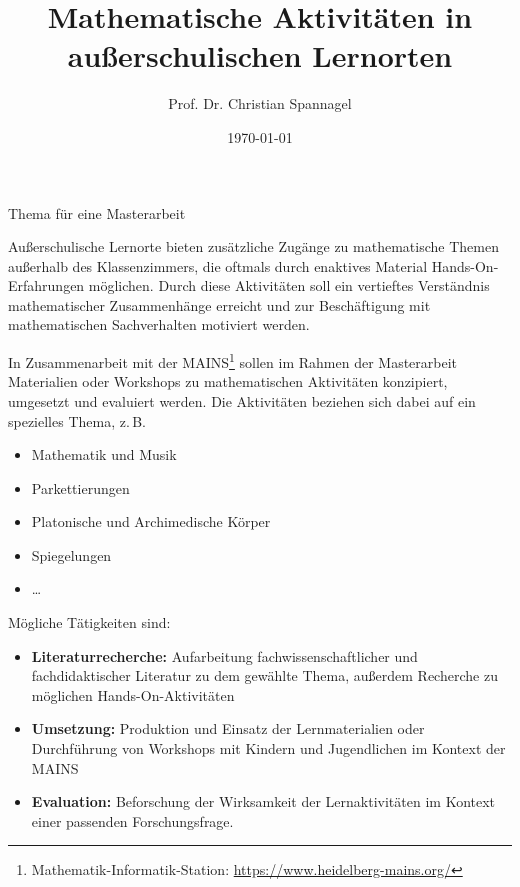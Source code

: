\documentclass{cssheet}
\title{Mathematische Aktivitäten in außerschulischen Lernorten}
\author{Prof. Dr. Christian Spannagel}
\date{\today}
\begin{document}
\vspace*{5mm}
\begin{center}
{\Large Thema für eine Masterarbeit}
\end{center}

\printtitle
\vspace*{1cm}

Außerschulische Lernorte bieten zusätzliche Zugänge zu mathematische Themen außerhalb des Klassenzimmers, die oftmals durch enaktives Material Hands-On-Erfahrungen möglichen. Durch diese Aktivitäten soll ein vertieftes Verständnis mathematischer Zusammenhänge erreicht und zur Beschäftigung mit mathematischen Sachverhalten motiviert werden.

In Zusammenarbeit mit der MAINS\footnote{Mathematik-Informatik-Station: \url{https://www.heidelberg-mains.org/}} sollen im Rahmen der Masterarbeit Materialien oder Workshops zu mathematischen Aktivitäten konzipiert, umgesetzt und evaluiert werden. Die Aktivitäten beziehen sich dabei auf ein spezielles Thema, z.\,B.
\begin{itemize}
\item Mathematik und Musik
\item Parkettierungen 
\item Platonische und Archimedische Körper
\item Spiegelungen
\item \ldots
\end{itemize}

Mögliche Tätigkeiten sind:
\begin{itemize}
\item \textbf{Literaturrecherche:} Aufarbeitung fachwissenschaftlicher und fachdidaktischer Literatur zu dem gewählte Thema, außerdem Recherche zu möglichen Hands-On-Aktivitäten
\item  \textbf{Umsetzung:} Produktion und Einsatz der Lernmaterialien oder Durchführung von Workshops mit Kindern und Jugendlichen im Kontext der MAINS 
\item  \textbf{Evaluation:} Beforschung der Wirksamkeit der Lernaktivitäten im Kontext einer passenden Forschungsfrage.
\end{itemize}

\vspace*{5mm}

\printlicense

\printsocials
\vspace*{5mm}
\end{document}
